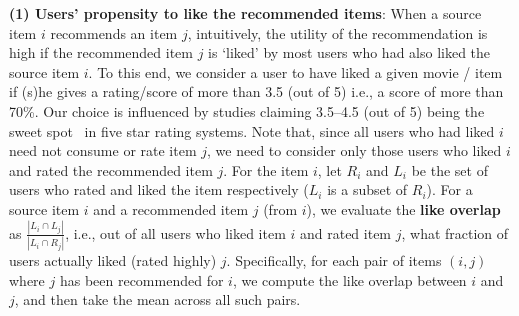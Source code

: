 \vspace{1mm}
\noindent 
\textbf{(1) Users' propensity to like the recommended items}:
When a source item $i$ recommends an item $j$,
intuitively, the utility of the recommendation is high if the recommended item $j$ is `liked' by most users who had also liked the source item $i$. 
To this end, we consider a user to have liked a given movie / item if (s)he gives a rating/score of more than 3.5 (out of 5) i.e., a score of more than 70\%. Our choice is influenced by studies claiming 3.5--4.5 (out of 5) being the sweet spot~\cite{WomplyHow, MetacriticHow} in five star rating systems. 
Note that, since all users who had liked $i$ need not consume or rate item $j$, we need to consider only those users who liked $i$ and rated the recommended item $j$. %
For the item $i$, let $R_i$ and $L_i$ be the set of users who rated and liked the item respectively ($L_i$ is a subset of $R_i$). 
For a source item $i$ and a recommended item $j$ (from $i$), we evaluate the \textbf{like overlap} as $\frac{|L_i \cap L_j|}{|L_i \cap R_j|}$, i.e., out of all users who liked item $i$ and rated item $j$, what fraction of users actually liked (rated highly) $j$.
Specifically, for each pair of items $(i,j)$ where $j$ has been recommended for $i$, we compute the like overlap between $i$ and $j$, and then take the mean across all such pairs.%

